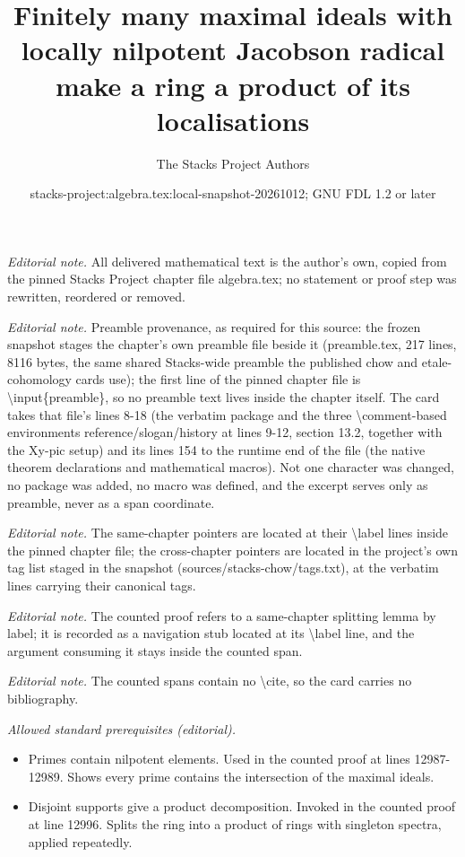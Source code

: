 \documentclass[10pt,a4paper]{amsart}
\title{Finitely many maximal ideals with locally nilpotent Jacobson radical make a ring a product of its localisations}
\author{The Stacks Project Authors}
\date{stacks-project:algebra.tex:local-snapshot-20261012; GNU FDL 1.2 or later}
\theoremstyle{plain}
\theoremstyle{definition}
\theoremstyle{remark}
\numberwithin{equation}{subsection}
\begin{document}
\maketitle
\noindent\textit{Editorial note.} All delivered mathematical text is the author's own, copied from the pinned Stacks Project chapter file algebra.tex; no statement or proof step was rewritten, reordered or removed.\par\medskip
\noindent\textit{Editorial note.} Preamble provenance, as required for this source: the frozen snapshot stages the chapter's own preamble file beside it (preamble.tex, 217 lines, 8116 bytes, the same shared Stacks-wide preamble the published chow and etale-cohomology cards use); the first line of the pinned chapter file is \textbackslash{}input\{preamble\}, so no preamble text lives inside the chapter itself. The card takes that file's lines 8-18 (the verbatim package and the three \textbackslash{}comment-based environments reference/slogan/history at lines 9-12, section 13.2, together with the Xy-pic setup) and its lines 154 to the runtime end of the file (the native theorem declarations and mathematical macros). Not one character was changed, no package was added, no macro was defined, and the excerpt serves only as preamble, never as a span coordinate.\par\medskip
\noindent\textit{Editorial note.} The same-chapter pointers are located at their \textbackslash{}label lines inside the pinned chapter file; the cross-chapter pointers are located in the project's own tag list staged in the snapshot (sources/stacks-chow/tags.txt), at the verbatim lines carrying their canonical tags.\par\medskip
\noindent\textit{Editorial note.} The counted proof refers to a same-chapter splitting lemma by label; it is recorded as a navigation stub located at its \textbackslash{}label line, and the argument consuming it stays inside the counted span.\par\medskip
\noindent\textit{Editorial note.} The counted spans contain no \textbackslash{}cite, so the card carries no bibliography.\par\medskip
\noindent\textit{Allowed standard prerequisites (editorial).}\begin{itemize}
\item Primes contain nilpotent elements. Used in the counted proof at lines 12987-12989. Shows every prime contains the intersection of the maximal ideals.
\item Disjoint supports give a product decomposition. Invoked in the counted proof at line 12996. Splits the ring into a product of rings with singleton spectra, applied repeatedly.
\end{itemize}\medskip
\end{document}
